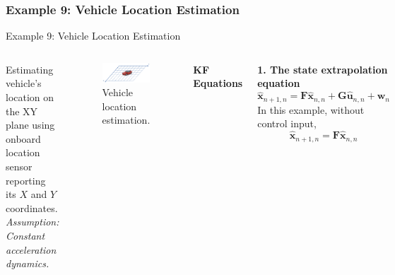 \subsubsection{Example 9: Vehicle Location Estimation}
\label{subsec:Ex9}
\begin{frame}{Example 9: Vehicle Location Estimation}
\begin{columns}
        Estimating vehicle’s location on the XY plane using onboard location sensor reporting its $X$ and $Y$ coordinates. \textit{Assumption: Constant acceleration dynamics.}
        \begin{figure}
            \centering
            \includegraphics[width=0.7\linewidth]{Figures//Chapter3/vehicleLocationEstimation.png}
            \vspace{-5pt}
            \caption{Vehicle location estimation.}
            \label{fig:locationEstimation}
            \vspace{-5pt}
        \end{figure}
        \textbf{KF Equations}
        
        \textbf{1. The state extrapolation equation}
        \begin{equation*}
        \hat{\mathbf{x}}_{n+1,n} = \mathbf{F} \hat{\mathbf{x}}_{n,n} + \mathbf{G}\hat{\mathbf{u}}_{n,n} + \mathbf{w}_{n}
        \end{equation*}
        In this example, without control input,
        \begin{equation*}
        \hat{\mathbf{x}}_{n+1,n} = \mathbf{F} \hat{\mathbf{x}}_{n,n}
        \end{equation*}
        

\end{columns}
\end{frame}
